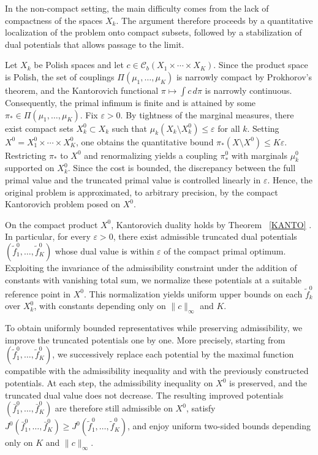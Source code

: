 \documentclass[twoside,11pt,a4paper]{article}
\newcommand*{\SavedRef}{}
\let\SavedRef\ref
\renewcommand*{\ref}[1]{  \begingroup
    \hypersetup{
      linkcolor=linkequation,
      linkbordercolor=linkequation,
    }    \SavedRef{#1}  \endgroup
}
\begin{document}
In the non-compact setting, the main difficulty comes from the lack of compactness of the spaces $X_k$.
 The argument therefore proceeds by a quantitative
localization of the problem onto compact subsets, followed by a stabilization of dual
potentials that allows passage to the limit.

Let $X_k$ be Polish spaces and let $c\in\mathcal C_b(X_1\times\cdots\times X_K)$. Since the
product space is Polish, the set of couplings $\Pi(\mu_1,\dots,\mu_K)$ is narrowly compact by
Prokhorov’s theorem, and the Kantorovich functional $\pi\mapsto\int c\,d\pi$ is narrowly
continuous. Consequently, the primal infimum is finite and is attained by some
$\pi_*\in\Pi(\mu_1,\dots,\mu_K)$. Fix $\varepsilon>0$. By tightness of the marginal measures, there exist compact sets
$X_k^0\subset X_k$ such that $\mu_k(X_k\setminus X_k^0)\le\varepsilon$ for all $k$. Setting
$X^0=X_1^0\times\cdots\times X_K^0$, one obtains the quantitative bound
\(
\pi_*(X\setminus X^0)\le K\varepsilon.
\)
Restricting $\pi_*$ to $X^0$ and renormalizing yields a coupling $\pi_*^0$ with marginals
$\mu_k^0$ supported on $X_k^0$. Since the cost is bounded, the discrepancy between the full
primal value and the truncated primal value is controlled linearly in $\varepsilon$. Hence, the
original problem is approximated, to arbitrary precision, by the compact Kantorovich problem
posed on $X^0$.

On the compact product $X^0$, Kantorovich duality holds by Theorem~\ref{KANTO}. In particular,
for every $\varepsilon>0$, there exist admissible truncated dual potentials
$(\widetilde f_1^0,\dots,\widetilde f_K^0)$ whose dual value is within $\varepsilon$ of the
compact primal optimum. Exploiting the invariance of the admissibility constraint under the
addition of constants with vanishing total sum, we normalize these potentials at a suitable
reference point in $X^0$. This normalization yields uniform upper bounds on each
$\widetilde f_k^0$ over $X_k^0$, with constants depending only on $\|c\|_\infty$ and $K$.

To obtain uniformly bounded representatives while preserving admissibility, we improve the
truncated potentials one by one. More precisely, starting from
\((\widetilde f_1^0,\dots,\widetilde f_K^0)\), we successively replace each
potential by the maximal function compatible with the admissibility inequality
and with the previously constructed potentials. At each step, the admissibility
inequality on \(X^0\) is preserved, and the truncated dual value does not
decrease. The resulting improved potentials
\((\bar f_1^0,\dots,\bar f_K^0)\) are therefore still admissible on \(X^0\),
satisfy $
J^0(\bar f_1^0,\dots,\bar f_K^0)
\ge
J^0(\widetilde f_1^0,\dots,\widetilde f_K^0)$,
and enjoy uniform two-sided bounds depending only on \(K\) and
\(\|c\|_\infty\).
\end{document}

